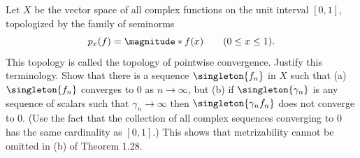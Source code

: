 % 
%
\begin{exerciseStatement}
Let $X$ be the vector space of all complex functions on the unit interval $[0, 1]$, topologized by the family of seminorms %
%
\begin{equation*}
  p_x(f) = \magnitude*{f(x)} \qquad (0 \leq x \leq 1).
\end{equation*}
%
This topology is called the topology of pointwise convergence. Justify this terminology. %
\skipline
Show that there is a sequence $\singleton{f_n}$ in $X$ such that (a) $\singleton{f_n}$ converges to $0$ as $n \to \infty$, but 
(b) if $\singleton{\gamma_n}$ is any sequence of scalars such that $\gamma_n \to \infty$ then $\singleton{\gamma_n f_n}$ does %
not converge to $0$. %
(Use the fact that the collection of all complex sequences converging to $0$ has the same cardinality as $[0, 1]$.) This shows 
that metrizability cannot be omitted in (b) of Theorem 1.28.
\end{exerciseStatement}
% 
